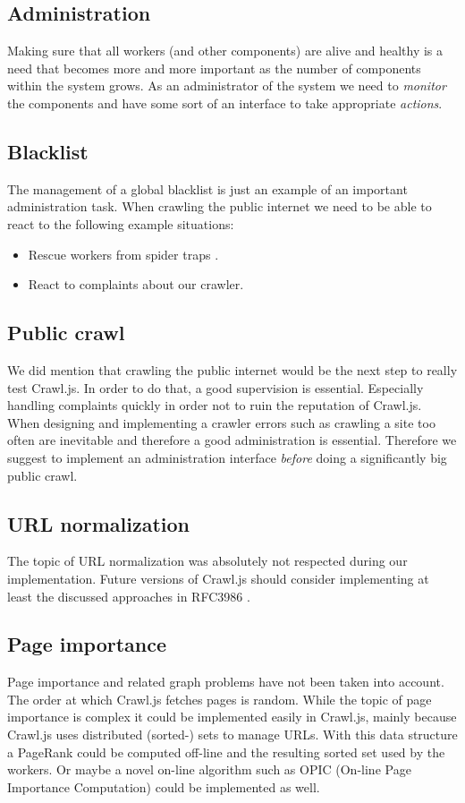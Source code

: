 \subsection{Administration}
Making sure that all workers (and other components) are alive and healthy is a need that becomes more and more important as the number of components within the system grows. As an administrator of the system we need to \emph{monitor} the components and have some sort of an interface to take appropriate \emph{actions}.

\subsection{Blacklist}
The management of a global blacklist is just an example of an important administration task. When crawling the public internet we need to be able to react to the following example situations:
\begin{itemize}
  \item Rescue workers from spider traps \cite{wiki:spider_trap}.
  \item React to complaints about our crawler.
\end{itemize}

\subsection{Public crawl}
We did mention that crawling the public internet would be the next step to really test Crawl.js. In order to do that, a good supervision is essential. Especially handling complaints quickly in order not to ruin the reputation of Crawl.js. When designing and implementing a crawler errors such as crawling a site too often are inevitable and therefore a good administration is essential. Therefore we suggest to implement an administration interface \emph{before} doing a significantly big public crawl.

\subsection{URL normalization}
The topic of URL normalization \cite{wiki:url_normalization} was absolutely not respected during our implementation. Future versions of Crawl.js should consider implementing at least the discussed approaches in RFC3986 \cite{rfc:url_normalization}.

\subsection{Page importance}
Page importance and related graph problems have not been taken into account. The order at which Crawl.js fetches pages is random. While the topic of page importance is complex it could be implemented easily in Crawl.js, mainly because Crawl.js uses distributed (sorted-) sets to manage URLs. With this data structure a PageRank\cite{google} could be computed off-line and the resulting sorted set used by the workers. Or maybe a novel on-line algorithm such as OPIC (On-line Page Importance Computation) \cite{page_importance1} could be implemented as well.
